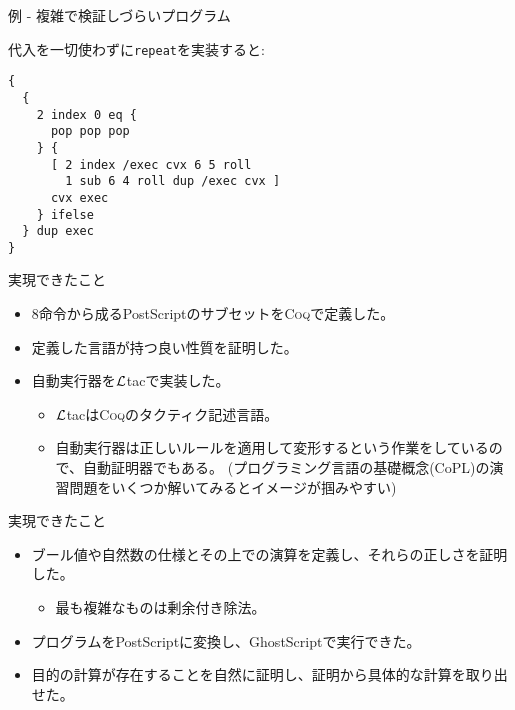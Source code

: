\documentclass[cjk, 14pt]{beamer}
\newcommand{\Coq}{{\scshape{}Coq}}
\newcommand{\Ltac}{\mbox{\emph{$\cal L$}tac}}
\begin{document}
\begin{frame}[fragile]{例 - 複雑で検証しづらいプログラム}

  代入を一切使わずに\texttt{repeat}を実装すると:

{ \small
\begin{verbatim}
{
  {
    2 index 0 eq {
      pop pop pop
    } {
      [ 2 index /exec cvx 6 5 roll
        1 sub 6 4 roll dup /exec cvx ]
      cvx exec
    } ifelse
  } dup exec
}
\end{verbatim} }

\end{frame}

\begin{frame}{実現できたこと}

  \begin{itemize}
    \item 8命令から成るPostScriptのサブセットを\Coq{}で定義した。
    \item 定義した言語が持つ良い性質を証明した。
    \item 自動実行器を\Ltac{}で実装した。
    \begin{itemize}
      \item \Ltac{}は\Coq{}のタクティク記述言語。
      \item 自動実行器は正しいルールを適用して変形するという作業をしているので、自動証明器でもある。
            (プログラミング言語の基礎概念(CoPL)の演習問題をいくつか解いてみるとイメージが掴みやすい)
    \end{itemize}
  \end{itemize}

\end{frame}

\begin{frame}{実現できたこと}

  \begin{itemize}
    \item ブール値や自然数の仕様とその上での演算を定義し、それらの正しさを証明した。
    \begin{itemize}
      \item 最も複雑なものは剰余付き除法。
    \end{itemize}
    \item プログラムをPostScriptに変換し、GhostScriptで実行できた。
    \item 目的の計算が存在することを自然に証明し、証明から具体的な計算を取り出せた。
  \end{itemize}

\end{frame}
\end{document}
